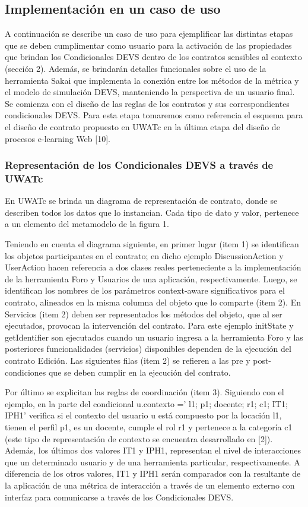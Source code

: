 \subsection {Implementación en un caso de uso}

A continuación se describe un caso de uso para ejemplificar las distintas etapas
que se deben cumplimentar como usuario para la activación de las propiedades que
brindan los Condicionales DEVS dentro de los contratos sensibles al contexto
(sección 2). Además, se brindarán detalles funcionales sobre el uso de la
herramienta Sakai que implementa la conexión entre los métodos de la métrica y
el modelo de simulación DEVS, manteniendo la perspectiva de un usuario final.
Se comienza con el diseño de las reglas de los contratos y sus correspondientes
condicionales DEVS. Para esta etapa tomaremos como referencia el esquema para el
diseño de contrato propuesto en UWATc en la última etapa del diseño de procesos
e-learning Web [10].

\subsubsection{Representación de los Condicionales DEVS a través de UWATc}

En UWATc se brinda un diagrama de representación de contrato, donde se describen
todos los datos que lo instancian. Cada tipo de dato y valor, pertenece a un
elemento del metamodelo de la figura 1.

Teniendo en cuenta el diagrama siguiente, en primer lugar (item 1) se
identifican los objetos participantes en el contrato; en dicho ejemplo
DiscussionAction y UserAction hacen referencia a dos clases reales perteneciente
a la implementación de la herramienta Foro y Usuarios de una aplicación,
respectivamente. Luego, se identifican los nombres de los parámetros
context-aware significativos para el contrato, alineados en la misma columna del
objeto que lo comparte (item 2). En Servicios (item 2) deben ser representados
los métodos del objeto, que al ser ejecutados, provocan la intervención del
contrato. Para este ejemplo initState y getIdentifier son ejecutados cuando un
usuario ingresa a la herramienta Foro y las posteriores funcionalidades
(servicios) disponibles dependen de la ejecución del contrato Edición. Las
siguientes filas (item 2) se refieren a las pre y post-condiciones que se deben
cumplir en la ejecución del contrato.


Por último se explicitan las reglas de coordinación (item 3). Siguiendo con el
ejemplo, en la parte del condicional u.contexto =' l1; p1; docente; r1; c1; IT1;
IPH1'  verifica si el contexto del usuario u está compuesto por la locación l1,
tienen el perfil p1, es un docente, cumple el rol r1 y pertenece a la categoría
c1 (este tipo de representación de contexto se encuentra desarrollado en [2]).
Además, los últimos dos valores IT1 y IPH1, representan el nivel de
interacciones que un determinado usuario y de una herramienta particular,
respectivamente. A diferencia de los otros valores, IT1 y IPH1 serán comparados
con la resultante de la aplicación de una métrica de interacción a través de un
elemento externo con interfaz para comunicarse a través de los Condicionales
DEVS.

